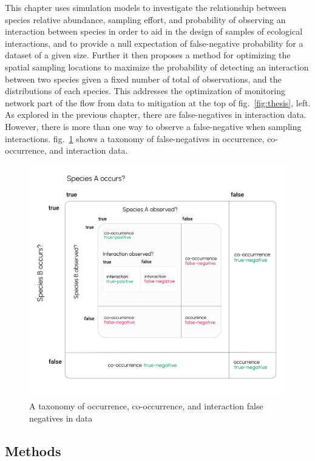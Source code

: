 \documentclass[11pt]{article}
\makeatletter
\def\maxwidth{\ifdim\Gin@nat@width>\linewidth\linewidth
\else\Gin@nat@width\fi}
\let\Oldincludegraphics\includegraphics
\renewcommand{\includegraphics}[1]{\Oldincludegraphics[width=\maxwidth]{#1}}
\makeatother
\begin{document}
This chapter uses simulation models to investigate the relationship
between species relative abundance, sampling effort, and probability of
observing an interaction between species in order to aid in the design
of samples of ecological interactions, and to provide a null expectation
of false-negative probability for a dataset of a given size. Further it
then proposes a method for optimizing the spatial sampling locations to
maximize the probability of detecting an interaction between two species
given a fixed number of total of observations, and the distributions of
each species. This addresses the optimization of monitoring network part
of the flow from data to mitigation at the top of fig.~\ref{fig:thesis},
left. As explored in the previous chapter, there are false-negatives in
interaction data. However, there is more than one way to observe a
false-negative when sampling interactions. fig.~\ref{fig:fnrtaxonomy}
shows a taxonomy of false-negatives in occurrence, co-occurrence, and
interaction data.

\begin{figure}
\hypertarget{fig:fnrtaxonomy}{%
\centering
\includegraphics{./figures/ch2.png}
\caption{A taxonomy of occurrence, co-occurrence, and interaction false
negatives in data}\label{fig:fnrtaxonomy}
}
\end{figure}

\hypertarget{methods}{%
\subsection{Methods}\label{methods}}
\end{document}
